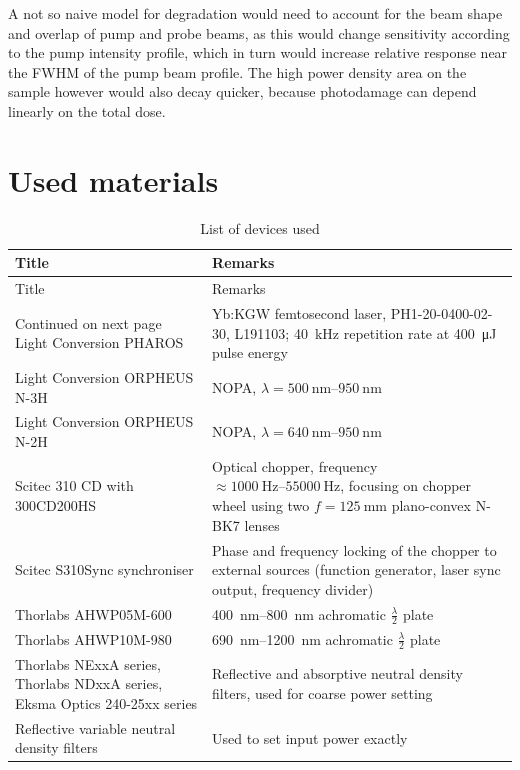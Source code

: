 \documentclass[twoside,openright]{scrreprt}
\begin{document}
A not so naive model for degradation would need to account for the beam shape and overlap of pump and probe beams, as this would change sensitivity according to the pump intensity profile, which in turn would increase relative response near the FWHM of the pump beam profile. The high power density area on the sample however would also decay quicker, because photodamage can depend linearly on the total dose.




\chapter*{Used materials}
\begin{longtable}{p{}p{}}
    \caption{List of devices used}
    \label{tab:devices} \\
    \toprule 
    Title & Remarks \\
    \midrule
    \endfirsthead
    \toprule 
    Title & Remarks \\
    \midrule
    \endhead
    \midrule
    Continued on next page
    \endfoot
    \bottomrule
    \endlastfoot
    Light Conversion PHAROS & Yb:KGW femtosecond laser, PH1-20-0400-02-30, L191103; \SI{40}{\kilo\hertz} repetition rate at \SI{400}{\micro\joule} pulse energy \\
    Light Conversion ORPHEUS N-3H & NOPA, $ \lambda = \SIrange{500}{950}{\nano\meter} $ \\
    Light Conversion ORPHEUS N-2H & NOPA, $ \lambda = \SIrange{640}{950}{\nano\meter} $ \\
    Scitec 310 CD with 300CD200HS & Optical chopper, frequency $\approx \SIrange{1000}{55000}{\hertz}$, focusing on chopper wheel using two $f=\SI{125}{\milli\meter}$ plano-convex N-BK7 lenses \\
    Scitec S310Sync synchroniser & Phase and frequency locking of the chopper to external sources (function generator, laser sync output, frequency divider) \\
    Thorlabs AHWP05M-600 & \SIrange{400}{800}{\nano\meter} achromatic $\frac{\lambda}{2}$ plate \\
    Thorlabs AHWP10M-980 & \SIrange{690}{1200}{\nano\meter} achromatic $\frac{\lambda}{2}$ plate \\
    Thorlabs NExxA series, Thorlabs NDxxA series, Eksma Optics 240-25xx series & Reflective and absorptive neutral density filters, used for coarse power setting \\
    Reflective variable neutral density filters & Used to set input power exactly \\

\end{longtable}
\end{document}
